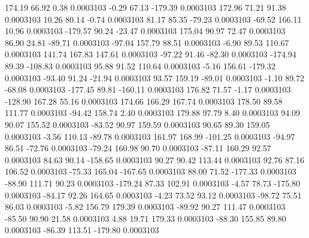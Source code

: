       174.19       66.92        0.38     0.0003103
       -0.29       67.13     -179.39     0.0003103
      172.96       71.21       91.38     0.0003103
       10.26       80.14       -0.74     0.0003103
       81.17       85.35      -79.23     0.0003103
      -69.52      166.11       10.96     0.0003103
     -179.57       90.24      -23.47     0.0003103
      175.04       90.97       72.47     0.0003103
       86.90       24.81      -89.71     0.0003103
      -97.04      157.79       88.51     0.0003103
       -6.90       89.53      110.67     0.0003103
      141.74      167.83      147.61     0.0003103
      -97.22       91.46      -82.30     0.0003103
     -174.94       89.39     -108.83     0.0003103
       95.88       91.52      110.64     0.0003103
       -5.16      156.61     -179.32     0.0003103
      -93.40       91.24      -21.94     0.0003103
       93.57      159.19      -89.01     0.0003103
       -1.10       89.72      -68.08     0.0003103
     -177.45       89.81     -160.11     0.0003103
      176.82       71.57       -1.17     0.0003103
     -128.90      167.28       55.16     0.0003103
      174.66      166.29      167.74     0.0003103
      178.50       89.58      111.77     0.0003103
      -94.42      158.74        2.40     0.0003103
      179.88       97.79        8.40     0.0003103
       94.09       90.07      155.52     0.0003103
      -83.52       90.97      159.59     0.0003103
       90.65       89.30      159.05     0.0003103
       -3.56      110.13      -89.78     0.0003103
      161.97      168.99     -101.25     0.0003103
      -94.97       86.51      -72.76     0.0003103
      -79.24      160.98       90.70     0.0003103
      -87.11      160.29       92.57     0.0003103
       84.63       90.14     -158.65     0.0003103
       90.27       90.42      113.44     0.0003103
       92.76       87.16      106.52     0.0003103
      -75.33      165.04     -167.65     0.0003103
       88.00       71.52     -177.33     0.0003103
      -88.90      111.71       90.23     0.0003103
     -179.24       87.33      102.91     0.0003103
       -4.57       78.73     -175.80     0.0003103
      -84.17       92.26      164.65     0.0003103
       -4.23       73.52       93.12     0.0003103
      -98.72       75.51       86.03     0.0003103
       -5.82      156.79      179.39     0.0003103
      -89.92       90.27      111.47     0.0003103
      -85.50       90.90       21.58     0.0003103
        4.88       19.71      179.33     0.0003103
      -88.30      155.85       89.80     0.0003103
      -86.39      113.51     -179.80     0.0003103
